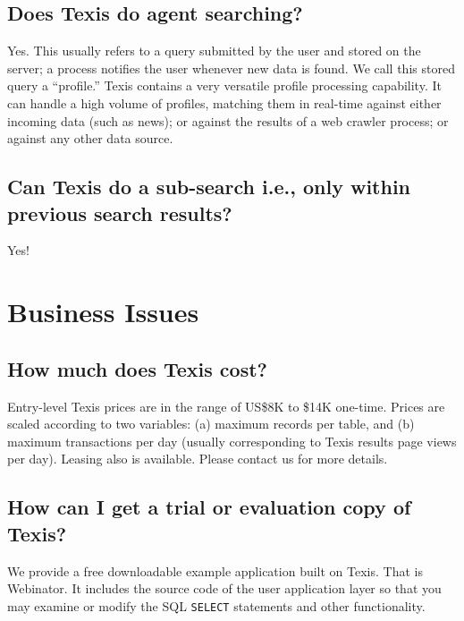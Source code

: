 \section{Does Texis do agent searching? }

Yes.  This usually refers to a query submitted by the user and stored
on the server; a process notifies the user whenever new data is found.
We call this stored query a ``profile.''  Texis contains a very
versatile profile processing capability.  It can handle a high volume
of profiles, matching them in real-time against either incoming data
(such as news); or against the results of a web crawler process; or
against any other data source.

\section{Can Texis do a sub-search i.e., only within previous search results? }

Yes!

\chapter{Business Issues}

\section{How much does Texis cost? }

Entry-level Texis prices are in the range of US\$8K to \$14K
one-time. Prices are scaled according to two variables: (a) maximum
records per table, and (b) maximum transactions per day (usually
corresponding to Texis results page views per day).  Leasing also is
available.  Please contact us for more details.

\section{How can I get a trial or evaluation copy of Texis? }

We provide a free downloadable example application built on Texis.
That is Webinator.  It includes the source code of the user
application layer so that you may examine or modify the SQL
\verb`SELECT` statements and other functionality.

